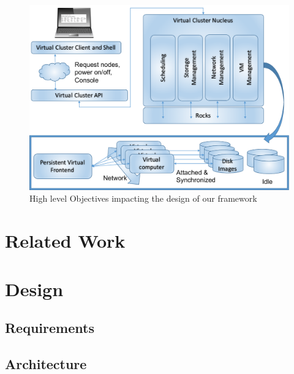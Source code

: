 \documentclass[10pt, conference, compsocconf]{IEEEtran}
\begin{document}
\begin{figure}[htb] 
  \centering 
    \includegraphics[width=1.0\columnwidth]{images/comet-arch.pdf} 
    \caption{High level Objectives impacting the design of our framework}
    \label{F:objectives}
\end{figure} 


\section{Related Work} \label{S:related}

\section{Design}

\subsection{Requirements}


\subsection{Architecture}

\end{document}
